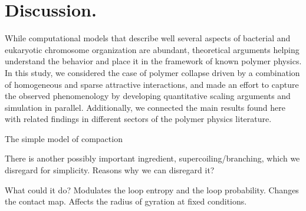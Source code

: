 \documentclass[a4paper,12pt,pre,superscriptaddress]{revtex4}
\begin{document}




\section{Discussion. }
\label{sec:Disc}


While computational models that describe well several aspects of
bacterial and eukaryotic chromosome organization are abundant,
theoretical arguments helping understand the behavior and place it in
the framework of known polymer physics.  
In this study, we considered the case of polymer collapse driven by a
combination of homogeneous and sparse attractive interactions, and
made an effort to capture the observed phenomenology by developing
quantitative scaling arguments and simulation in parallel. 
Additionally, we connected the main results found here with related
findings in different sectors of the polymer physics literature. 

The simple model of compaction



%


There is another possibly important ingredient,
supercoiling/branching, which we disregard for simplicity. Reasons why
we can disregard it?

What could it do? Modulates the loop entropy and the loop
probability. Changes the contact map. Affects the radius of gyration
at fixed conditions.

% 
%
%
\end{document}
